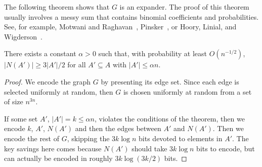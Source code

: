 \documentclass{patmorin}
\begin{document}
The following theorem shows that $G$ is an expander.  The proof of
this theorem usually involves a messy sum that contains binomial
coefficients and probabilities.  See, for example, Motwani and
Raghavan~\cite[Theorem~5.3]{motwani.raghavan:randomized}, Pinsker~\cite[Lemma 1]{pinsker:on}, or Hoory, Linial, and Wigderson~\cite[Lemma~1.9]{hoory.linial.ea:expander}.

\begin{thm}
  There exists a constant $\alpha >0$ such that, with probability at
  least $O(n^{-1/2})$, $|N(A')| \ge 3|A'|/2$ for all $A'\subseteq A$
  with $|A'|\le \alpha n$.
\end{thm}

\begin{proof}
  We encode the graph $G$ by presenting its edge set. Since each edge
  is selected uniformly at random, then $G$ is chosen uniformly at
  random from a set of size $n^{3n}$.

  If some set $A'$, $|A'|=k\le \alpha n$, violates the conditions of
  the theorem, then we encode $k$, $A'$, $N(A')$ and then the edges
  between $A'$ and $N(A')$. Then we encode the rest of $G$, skipping
  the $3k\log n$ bits devoted to elements in $A'$.  The key savings
  here comes because $N(A')$ should take $3k\log n$ bits to encode,
  but can actually be encoded in roughly $3k\log(3k/2)$ bits.


\end{proof}
\end{document}
